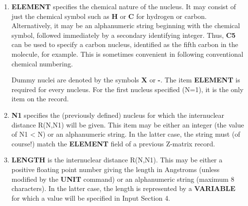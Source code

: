 \begin{enumerate}
\item {\bf ELEMENT} specifies the chemical nature of the nucleus. It may
consist of just the chemical symbol such as {\bf H} or {\bf C} 
for hydrogen or
carbon.  Alternatively, it may be an alphanumeric string beginning with
the chemical symbol, followed immediately by a secondary identifying
integer. Thus, {\bf C5} can be used to specify a carbon nucleus, identified
as the fifth carbon in the molecule, for example. 
This is sometimes convenient in
following conventional chemical numbering. 

Dummy nuclei are denoted by
the symbols {\bf X} or {\bf -}. The item {\bf ELEMENT} 
is required for every
nucleus. For the first nucleus specified (N=1), it is the only item on
the record.
\item {\bf N1} specifies the (previously defined) nucleus for which the
internuclear distance R(N,N1) will be given. This item may be either an
integer (the value of N1 < N) or an alphanumeric string. In the latter
case, the string must (of course!) match 
the {\bf ELEMENT} field of a previous Z-matrix
record.
\item {\bf LENGTH} is the internuclear distance R(N,N1). 
This may be either a
positive floating point number giving the length in Angstroms (unless
modified by the {\bf UNIT} command) or an alphanumeric string (maximum 8
characters). In the latter case, the length is represented by a
{\bf VARIABLE} for which a value will be specified in Input Section 4. 


\end{enumerate}
